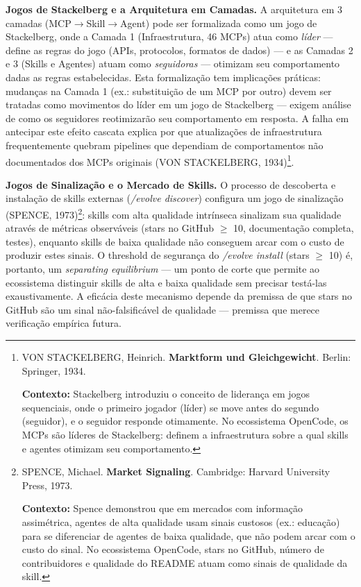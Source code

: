 \textbf{Jogos de Stackelberg e a Arquitetura em Camadas.} A arquitetura em 3 camadas (MCP$\rightarrow$Skill$\rightarrow$Agent) pode ser formalizada como um jogo de Stackelberg, onde a Camada 1 (Infraestrutura, 46 MCPs) atua como \textit{líder} --- define as regras do jogo (APIs, protocolos, formatos de dados) --- e as Camadas 2 e 3 (Skills e Agentes) atuam como \textit{seguidoras} --- otimizam seu comportamento dadas as regras estabelecidas. Esta formalização tem implicações práticas: mudanças na Camada 1 (ex.: substituição de um MCP por outro) devem ser tratadas como movimentos do líder em um jogo de Stackelberg --- exigem análise de como os seguidores reotimizarão seu comportamento em resposta. A falha em antecipar este efeito cascata explica por que atualizações de infraestrutura frequentemente quebram pipelines que dependiam de comportamentos não documentados dos MCPs originais (VON STACKELBERG, 1934)\footnote{
  VON STACKELBERG, Heinrich. \textbf{Marktform und Gleichgewicht}. Berlin: Springer, 1934.

  \textbf{Contexto:} Stackelberg introduziu o conceito de liderança em jogos sequenciais, onde o primeiro jogador (líder) se move antes do segundo (seguidor), e o seguidor responde otimamente. No ecossistema OpenCode, os MCPs são líderes de Stackelberg: definem a infraestrutura sobre a qual skills e agentes otimizam seu comportamento.
}.

\textbf{Jogos de Sinalização e o Mercado de Skills.} O processo de descoberta e instalação de skills externas (\textit{/evolve discover}) configura um jogo de sinalização (SPENCE, 1973)\footnote{
  SPENCE, Michael. \textbf{Market Signaling}. Cambridge: Harvard University Press, 1973.

  \textbf{Contexto:} Spence demonstrou que em mercados com informação assimétrica, agentes de alta qualidade usam sinais custosos (ex.: educação) para se diferenciar de agentes de baixa qualidade, que não podem arcar com o custo do sinal. No ecossistema OpenCode, stars no GitHub, número de contribuidores e qualidade do README atuam como sinais de qualidade da skill.
}: skills com alta qualidade intrínseca sinalizam sua qualidade através de métricas observáveis (stars no GitHub $\geq$ 10, documentação completa, testes), enquanto skills de baixa qualidade não conseguem arcar com o custo de produzir estes sinais. O threshold de segurança do \textit{/evolve install} (stars $\geq$ 10) é, portanto, um \textit{separating equilibrium} --- um ponto de corte que permite ao ecossistema distinguir skills de alta e baixa qualidade sem precisar testá-las exaustivamente. A eficácia deste mecanismo depende da premissa de que stars no GitHub são um sinal não-falsificável de qualidade --- premissa que merece verificação empírica futura.

